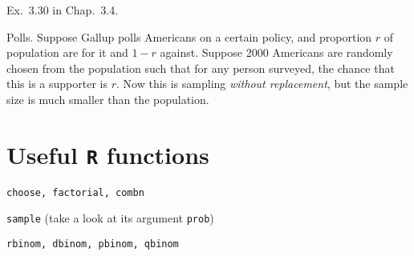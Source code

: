 \documentclass[12pt]{article}
\begin{document}
\example
Ex.~3.30 in Chap.~3.4.

\example
Polls.
Suppose Gallup polls Americans on a certain policy,
and proportion $r$ of population are for it and $1-r$ against.
Suppose 2000 Americans are randomly chosen from the population
such that for any person surveyed, the chance that this is
a supporter is $r$.
Now this is sampling \emph{without replacement},
but the sample size is much smaller than the population.

\section{Useful \texttt{R} functions}

\texttt{choose, factorial, combn}

\texttt{sample} (take a look at its argument \texttt{prob})

\texttt{rbinom, dbinom, pbinom, qbinom}
\end{document}
